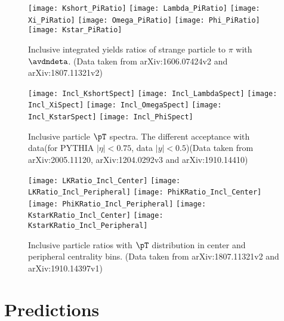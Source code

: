 \documentclass[ALICE,manyauthors]{StrinJet}
\begin{document}
\begin{figure}[ht]
	\begin{center}
		\texttt{[image: Kshort\_PiRatio]}
		\texttt{[image: Lambda\_PiRatio]}
		\texttt{[image: Xi\_PiRatio]}
		\texttt{[image: Omega\_PiRatio]}
		\texttt{[image: Phi\_PiRatio]}	\texttt{[image: Kstar\_PiRatio]}
	\end{center}
	\caption{Inclusive integrated yields ratios of strange particle to $\pi$ with $\avdndeta$. (Data taken from arXiv:1606.07424v2 and arXiv:1807.11321v2)}
	\label{fig:InclIntePartoPiRatio}
\end{figure}

\begin{figure}[ht]
	\begin{center}
		\texttt{[image: Incl\_KshortSpect]}
		\texttt{[image: Incl\_LambdaSpect]}
		\texttt{[image: Incl\_XiSpect]}
		\texttt{[image: Incl\_OmegaSpect]}
		\texttt{[image: Incl\_KstarSpect]}
		\texttt{[image: Incl\_PhiSpect]}
	\end{center}
	\caption{Inclusive particle $\pT$ spectra. The different acceptance with data(for PYTHIA $|\eta|<0.75$, data $|y|<0.5$)(Data taken from arXiv:2005.11120, arXiv:1204.0292v3 and arXiv:1910.14410)}
	\label{fig:InclParSpect}
\end{figure}

\begin{figure}[ht]
	\begin{center}
		\texttt{[image: LKRatio\_Incl\_Center]}
		\texttt{[image: LKRatio\_Incl\_Peripheral]}
		\texttt{[image: PhiKRatio\_Incl\_Center]}
		\texttt{[image: PhiKRatio\_Incl\_Peripheral]}
		\texttt{[image: KstarKRatio\_Incl\_Center]}
		\texttt{[image: KstarKRatio\_Incl\_Peripheral]}
	\end{center}
	\caption{Inclusive particle ratios  with $\pT$ distribution in center and peripheral centrality bins. (Data taken from arXiv:1807.11321v2 and arXiv:1910.14397v1)}
	\label{fig:InclParRatioCentPeri}
\end{figure}

\section{Predictions}
\label{sec:predic}
\end{document}
